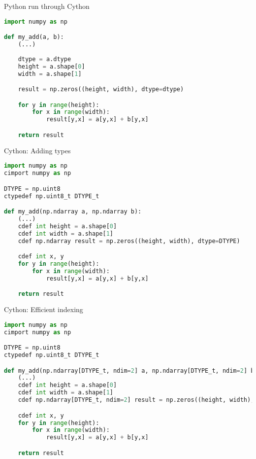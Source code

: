 \documentclass[dvipsnames]{beamer}
\begin{document}
\begin{frame}[fragile]{Python run through Cython}
\begin{lstlisting}[language=Python,caption={add2.pyx}]
import numpy as np

def my_add(a, b):
    (...)
	
    dtype = a.dtype
    height = a.shape[0]
    width = a.shape[1]

    result = np.zeros((height, width), dtype=dtype)

    for y in range(height):
        for x in range(width):
            result[y,x] = a[y,x] + b[y,x]

    return result
\end{lstlisting}
\end{frame}

\begin{frame}[fragile]{Cython: Adding types}

\begin{lstlisting}[language=Python,caption={add3.pyx}]
import numpy as np
cimport numpy as np

DTYPE = np.uint8
ctypedef np.uint8_t DTYPE_t

def my_add(np.ndarray a, np.ndarray b):
    (...)
    cdef int height = a.shape[0]
    cdef int width = a.shape[1]
    cdef np.ndarray result = np.zeros((height, width), dtype=DTYPE)

    cdef int x, y
    for y in range(height):
        for x in range(width):
            result[y,x] = a[y,x] + b[y,x]

    return result
\end{lstlisting}
\end{frame}

\begin{frame}[fragile]{Cython: Efficient indexing}
\begin{lstlisting}[language=Python,caption={add4.pyx}]
import numpy as np
cimport numpy as np

DTYPE = np.uint8
ctypedef np.uint8_t DTYPE_t

def my_add(np.ndarray[DTYPE_t, ndim=2] a, np.ndarray[DTYPE_t, ndim=2] b):
    (...)
    cdef int height = a.shape[0]
    cdef int width = a.shape[1]
    cdef np.ndarray[DTYPE_t, ndim=2] result = np.zeros((height, width), dtype=DTYPE)

    cdef int x, y
    for y in range(height):
        for x in range(width):
            result[y,x] = a[y,x] + b[y,x]

    return result
\end{lstlisting}
\end{frame}
\end{document}
